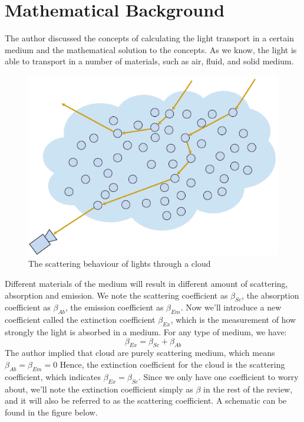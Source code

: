 \section{Mathematical Background}
The author discussed the concepts of calculating the light transport in a certain medium and the mathematical solution to the concepts. As we know, the light is able to transport in a number of materials, such as air, fluid, and solid medium. 
\begin{figure}[htp]
\begin{center}
\includegraphics[scale=0.6]{images/scattering.png}
\caption{The scattering behaviour of lights through a cloud}
\label{f5}
\end{center}
\end{figure}
Different materials of the medium will result in different amount of scattering, absorption and emission. We note the scattering coefficient as $\beta_{Sc}$, the absorption coefficient as $\beta_{Ab}$, the emission coefficient as $\beta_{Em}$. Now we'll introduce a new coefficient called the extinction coefficient $\beta_{Ex}$, which is the measurement of how strongly the light is absorbed in a medium. For any type of medium, we have:
\begin{equation}
\beta_{Ex} = \beta_{Sc} + \beta_{Ab}
\end{equation}
The author implied that cloud are purely scattering medium, which means $\beta_{Ab} = \beta_{Em} = 0$
Hence, the extinction coefficient for the cloud is the scattering coefficient, which indicates $\beta_{Ex} = \beta_{Sc}$. Since we only have one coefficient to worry about, we'll note the extinction coefficient simply as $\beta$ in the rest of the review, and it will also be referred to as the scattering coefficient. A schematic can be found in the figure below.

